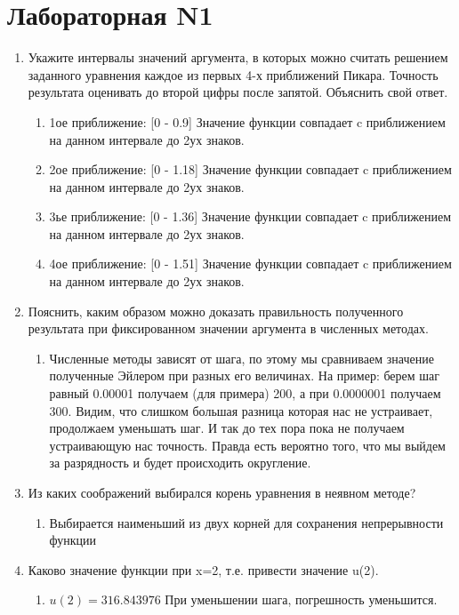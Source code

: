 \documentclass[12pt,a4paper]{scrartcl}
\begin{document}
	\section{Лабораторная N1}
	\begin{enumerate}
		\item Укажите интервалы значений аргумента, в которых можно считать решением заданного уравнения каждое из первых 4-х  приближений Пикара. Точность результата оценивать до второй цифры после запятой. Объяснить свой ответ.
		\begin{enumerate}
			\item 1ое приближение: [0 - 0.9] Значение функции совпадает c приближением на данном интервале до 2ух знаков. 
			\item 2ое приближение: [0 - 1.18] Значение функции совпадает c приближением на данном интервале до 2ух знаков. 
			\item 3ье приближение: [0 - 1.36] Значение функции совпадает c приближением на данном интервале до 2ух знаков.
			\item 4ое приближение: [0 - 1.51] Значение функции совпадает c приближением на данном интервале до 2ух знаков.
		\end{enumerate}
		\item Пояснить, каким образом можно доказать правильность полученного результата при фиксированном значении аргумента  в численных методах. 
		\begin{enumerate}
			\item Численные методы зависят от шага, по этому мы сравниваем значение полученные Эйлером при разных его величинах. На пример: берем шаг равный 0.00001 получаем (для примера) 200, а при 0.0000001 получаем 300. Видим, что слишком большая разница которая нас не устраивает, продолжаем уменьшать шаг. И так до тех пора пока не получаем устраивающую нас точность. Правда есть вероятно того, что мы выйдем за разрядность и будет происходить округление.
		\end{enumerate}
		\item Из каких соображений выбирался корень уравнения в неявном методе?
		\begin{enumerate}
			\item Выбирается наименьший из двух корней для сохранения непрерывности функции
		\end{enumerate}
		\item Каково значение функции при x=2, т.е. привести значение u(2).		
		\begin{enumerate}
			\item $ u(2) = 316.843976$ При уменьшении шага, погрешность уменьшится.
		\end{enumerate}
	\end{enumerate}
	
\end{document}
